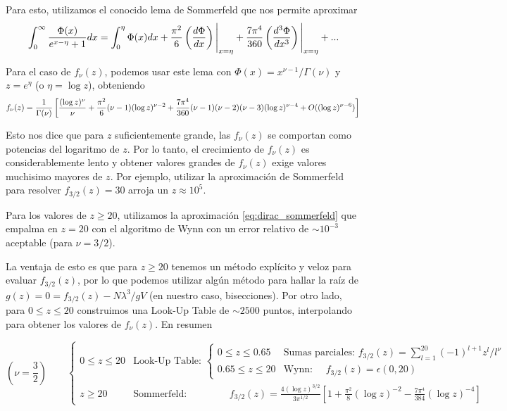Para esto, utilizamos el conocido lema de Sommerfeld que nos permite aproximar 
\begin{equation}{\label{eq:sommerfeld}}
 \int_0^\infty \frac{\Phi(x)}{e^{x-\eta}+1}dx = \int_0^\eta \Phi(x) dx + \frac{\pi^2}{6}\left( \frac{d\Phi}{dx} \right)\Bigg|_{x=\eta} + 
 \frac{7\pi^4}{360}\left( \frac{d^3\Phi}{dx^3} \right)\Bigg|_{x=\eta} + ...
\end{equation}

Para el caso de $f_\nu(z)$, podemos usar este lema con $\Phi(x) = x^{\nu-1}/\Gamma(\nu)$ y $z = e^{\eta}$ (o $\eta = \log z$), obteniendo
\begin{equation}{\label{eq:dirac_sommerfeld}}
f_\nu(z) = \frac{1}{\Gamma(\nu)}\left[ \frac{(\log z)^\nu}{\nu} + \frac{\pi^2}{6}(\nu - 1)(\log z)^{\nu-2} + \frac{7\pi^4}{360}(\nu - 1)(\nu - 2)(\nu - 3)(\log z)^{\nu - 4} 
+ O((\log z)^{\nu-6})  \right]
\end{equation}
 
Esto nos dice que para $z$ suficientemente grande, las $f_\nu(z)$ se comportan como potencias del logaritmo de $z$.
Por lo tanto, el crecimiento de $f_\nu(z)$ es considerablemente lento y obtener valores grandes de $f_\nu(z)$ exige valores muchisimo mayores de $z$.
Por ejemplo, utilizar la aproximación de Sommerfeld para resolver $f_{3/2}(z) = 30$ arroja un $z\approx 10^5$. 

Para los valores de $z\geq 20$, utilizamos la aproximación \eqref{eq:dirac_sommerfeld} que empalma en $z=20$ con el algoritmo de Wynn con un error relativo de 
$\sim10^{-3}$ aceptable (para $\nu=3/2$). 

La ventaja de esto es que para $z\geq 20$ tenemos un método explícito y veloz para evaluar $f_{3/2}(z)$, por lo que podemos utilizar algún método para hallar la 
raíz de $g(z) = 0 = f_{3/2}(z) - N\lambda^3/gV$ (en nuestro caso, bisecciones).
Por otro lado, para $0\leq z\leq 20$ construimos una Look-Up Table de $\sim 2500$ puntos, interpolando para obtener los valores de $f_\nu(z)$.
En resumen

\[  \left(\nu = \frac{3}{2}\right) \qquad
 \left\{\begin{matrix}
  0 \leq z \leq 20 & \text{Look-Up Table: } \left\{\begin{matrix}
		    0 \leq z \leq 0.65 & \text{Sumas parciales: } f_{3/2}(z) = \sum_{l=1}^{20} (-1)^{l+1} z^l/l^\nu \\
		    0.65 \leq z \leq 20 & \text{Wynn: } \quad f_{3/2}(z) = \epsilon(0,20) 
		    \end{matrix}\right. \\
 z\geq 20 & \text{Sommerfeld: } \qquad \qquad f_{3/2}(z) = \frac{4(\log z)^{3/2}}{3\pi^{1/2}}\left[ 1 + \frac{\pi^2}{8}(\log z)^{-2} - \frac{7\pi^4}{384}(\log z)^{-4}  \right]
 \end{matrix} \right.
\]

